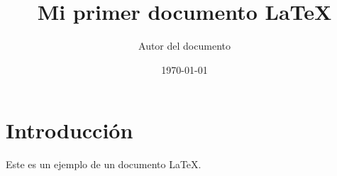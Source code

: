 \documentclass{report}
\title{Mi primer documento LaTeX}
\author{Autor del documento}
\date{\today}
\begin{document}
\maketitle

\section{Introducción}
Este es un ejemplo de un documento LaTeX.
\end{document}

